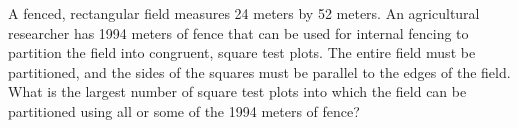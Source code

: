 A fenced, rectangular field measures 24 meters by 52 meters.  An agricultural researcher has 1994 meters of fence that can be used for internal fencing to partition the field into congruent, square test plots.  The entire field must be partitioned, and the sides of the squares must be parallel to the edges of the field.  What is the largest number of square test plots into which the field can be partitioned using all or some of the 1994 meters of fence?